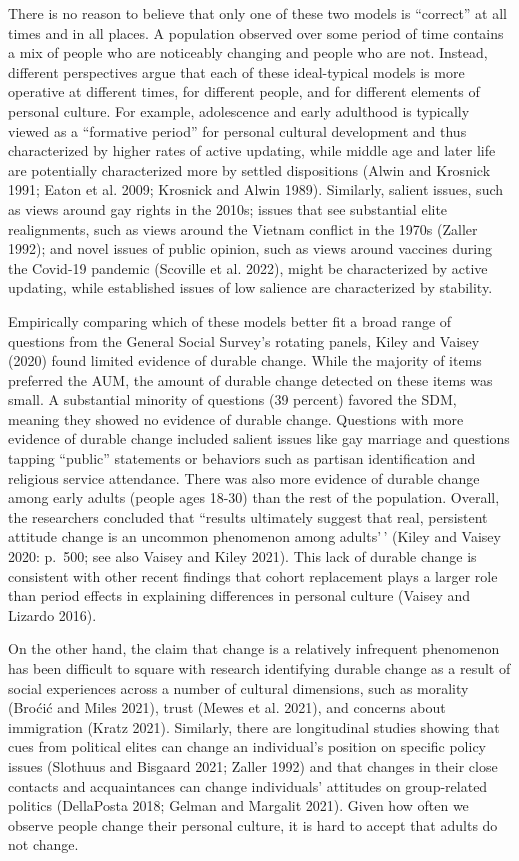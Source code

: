 \documentclass[
  12pt,
]{article}
\begin{document}
There is no reason to believe that only one of these two models is
``correct'' at all times and in all places. A population observed over
some period of time contains a mix of people who are noticeably changing
and people who are not. Instead, different perspectives argue that each
of these ideal-typical models is more operative at different times, for
different people, and for different elements of personal culture. For
example, adolescence and early adulthood is typically viewed as a
``formative period'' for personal cultural development and thus
characterized by higher rates of active updating, while middle age and
later life are potentially characterized more by settled dispositions
(Alwin and Krosnick 1991; Eaton et al. 2009; Krosnick and Alwin 1989).
Similarly, salient issues, such as views around gay rights in the 2010s;
issues that see substantial elite realignments, such as views around the
Vietnam conflict in the 1970s (Zaller 1992); and novel issues of public
opinion, such as views around vaccines during the Covid-19 pandemic
(Scoville et al. 2022), might be characterized by active updating, while
established issues of low salience are characterized by stability.

Empirically comparing which of these models better fit a broad range of
questions from the General Social Survey's rotating panels, Kiley and
Vaisey (2020) found limited evidence of durable change. While the
majority of items preferred the AUM, the amount of durable change
detected on these items was small. A substantial minority of questions
(39 percent) favored the SDM, meaning they showed no evidence of durable
change. Questions with more evidence of durable change included salient
issues like gay marriage and questions tapping ``public'' statements or
behaviors such as partisan identification and religious service
attendance. There was also more evidence of durable change among early
adults (people ages 18-30) than the rest of the population. Overall, the
researchers concluded that ``results ultimately suggest that real,
persistent attitude change is an uncommon phenomenon among adults'\,'
(Kiley and Vaisey 2020: p.~500; see also Vaisey and Kiley 2021). This
lack of durable change is consistent with other recent findings that
cohort replacement plays a larger role than period effects in explaining
differences in personal culture (Vaisey and Lizardo 2016).

On the other hand, the claim that change is a relatively infrequent
phenomenon has been difficult to square with research identifying
durable change as a result of social experiences across a number of
cultural dimensions, such as morality (Broćić and Miles 2021), trust
(Mewes et al. 2021), and concerns about immigration (Kratz 2021).
Similarly, there are longitudinal studies showing that cues from
political elites can change an individual's position on specific policy
issues (Slothuus and Bisgaard 2021; Zaller 1992) and that changes in
their close contacts and acquaintances can change individuals' attitudes
on group-related politics (DellaPosta 2018; Gelman and Margalit 2021).
Given how often we observe people change their personal culture, it is
hard to accept that adults do not change.
\end{document}
